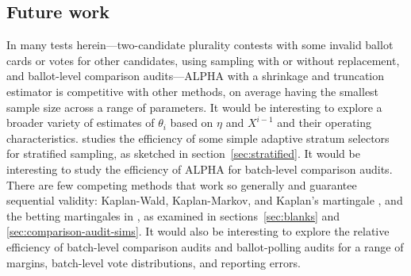 \documentclass[aoas]{imsart}
\begin{document}
\subsection{Future work}
In many tests herein---two-candidate plurality contests with some invalid ballot cards or votes for other candidates, using
sampling with or without replacement, and ballot-level comparison audits---ALPHA with a shrinkage and truncation 
estimator is competitive with other methods, on average having the smallest sample size across a range of parameters.
It would be interesting
to explore a broader variety of estimates of $\theta_i$ based on $\eta$ and $X^{i-1}$ and their operating characteristics.
\citet{spertusStark22} studies the efficiency of some simple adaptive stratum selectors for stratified sampling,
as sketched in section~\ref{sec:stratified}.
It would be interesting to study the efficiency of ALPHA for batch-level comparison audits.
There are few competing methods that work so generally and guarantee sequential validity: 
Kaplan-Wald, Kaplan-Markov, and Kaplan's martingale \citep{stark09a,stark20},
and the betting martingales in \citet{waudby-smithEtal21}, as examined in sections~\ref{sec:blanks} and \ref{sec:comparison-audit-sims}.
It would also be interesting to explore the relative efficiency of batch-level comparison audits and ballot-polling audits for
a range of margins, batch-level vote distributions, and reporting errors.
\end{document}
